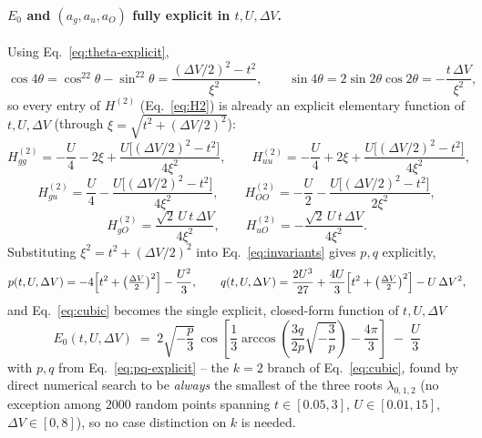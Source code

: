 \documentclass[11pt]{article}
\begin{document}
\paragraph{$E_0$ and $(a_g,a_u,a_O)$ fully explicit in $t,U,\Delta V$.} Using
Eq.~\eqref{eq:theta-explicit},
\begin{equation}
  \cos4\theta=\cos^22\theta-\sin^22\theta=\frac{(\Delta V/2)^2-t^2}{\xi^2},
  \qquad
  \sin4\theta=2\sin2\theta\cos2\theta=-\frac{t\,\Delta V}{\xi^2},
  \label{eq:cos4theta}
\end{equation}
so every entry of $H^{(2)}$ (Eq.~\eqref{eq:H2}) is already an explicit elementary function
of $t,U,\Delta V$ (through $\xi=\sqrt{t^2+(\Delta V/2)^2}$):
\begin{equation}
  H^{(2)}_{gg}=-\frac U4-2\xi+\frac{U\bigl[(\Delta V/2)^2-t^2\bigr]}{4\xi^2},
  \qquad
  H^{(2)}_{uu}=-\frac U4+2\xi+\frac{U\bigl[(\Delta V/2)^2-t^2\bigr]}{4\xi^2},
  \label{eq:H2-explicit-diag}
\end{equation}
\begin{equation}
  H^{(2)}_{gu}=\frac U4-\frac{U\bigl[(\Delta V/2)^2-t^2\bigr]}{4\xi^2},
  \qquad
  H^{(2)}_{OO}=-\frac U2-\frac{U\bigl[(\Delta V/2)^2-t^2\bigr]}{2\xi^2},
  \label{eq:H2-explicit-mixed}
\end{equation}
\begin{equation}
  H^{(2)}_{gO}=\frac{\sqrt2\,U\,t\,\Delta V}{4\xi^2},
  \qquad
  H^{(2)}_{uO}=-\frac{\sqrt2\,U\,t\,\Delta V}{4\xi^2}.
  \label{eq:H2-explicit-offdiag}
\end{equation}
Substituting $\xi^2=t^2+(\Delta V/2)^2$ into Eq.~\eqref{eq:invariants} gives $p,q$ explicitly,
\begin{equation}
  p(t,U,\Delta V)=-4\Bigl[t^2+\bigl(\tfrac{\Delta V}2\bigr)^{2}\Bigr]-\frac{U^2}{3},
  \qquad
  q(t,U,\Delta V)=\frac{2U^3}{27}+\frac{4U}{3}\Bigl[t^2+\bigl(\tfrac{\Delta V}2\bigr)^{2}\Bigr]-U\,\Delta V^2,
  \label{eq:pq-explicit}
\end{equation}
and Eq.~\eqref{eq:cubic} becomes the single explicit, closed-form function of $t,U,\Delta V$
\begin{equation}
  \boxed{\;
  E_0(t,U,\Delta V) \;=\; 2\sqrt{-\frac p3}\,
    \cos\!\left[\frac13\arccos\!\left(\frac{3q}{2p}\sqrt{-\frac3p}\right)-\frac{4\pi}{3}\right]
    \;-\;\frac U3 \;}
  \label{eq:E0-explicit}
\end{equation}
with $p,q$ from Eq.~\eqref{eq:pq-explicit} -- the $k=2$ branch of Eq.~\eqref{eq:cubic}, found
by direct numerical search to be \emph{always} the smallest of the three roots $\lambda_{0,1,2}$
(no exception among $2000$ random points spanning $t\in[0.05,3]$, $U\in[0.01,15]$,
$\Delta V\in[0,8]$), so no case distinction on $k$ is needed.
\end{document}
